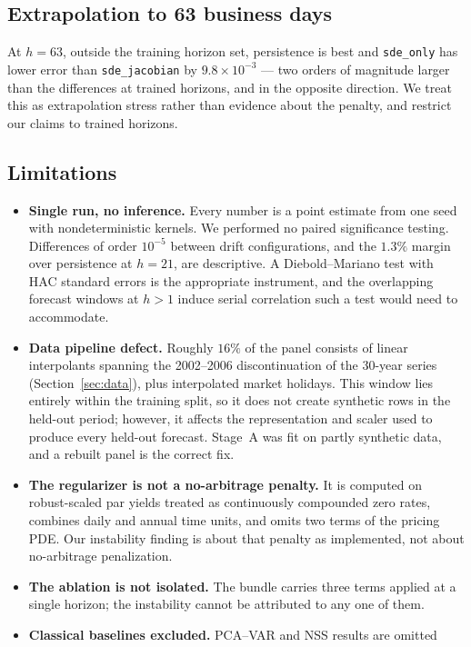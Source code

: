 \documentclass{article} %
\begin{document}
\subsection{Extrapolation to 63 business days}
\label{sec:analysis-h63}
At $h{=}63$, outside the training horizon set, persistence is best and
\texttt{sde\_only} has lower error than \texttt{sde\_jacobian} by $9.8\times10^{-3}$
--- two orders of magnitude larger than the differences at trained horizons, and in
the opposite direction. We treat this as extrapolation stress rather than evidence
about the penalty, and restrict our claims to trained horizons.
\subsection{Limitations}
\label{sec:analysis-limitations}
\begin{itemize}
  \item \textbf{Single run, no inference.} Every number is a point estimate from one
  seed with nondeterministic kernels. We performed no paired significance testing.
  Differences of order $10^{-5}$ between drift configurations, and the $1.3\%$ margin
  over persistence at $h{=}21$, are descriptive. A Diebold--Mariano test with HAC
  standard errors is the appropriate instrument, and the overlapping forecast windows
  at $h>1$ induce serial correlation such a test would need to accommodate.
  \item \textbf{Data pipeline defect.} Roughly $16\%$ of the panel consists of linear
  interpolants spanning the 2002--2006 discontinuation of the 30-year series
  (Section~\ref{sec:data}), plus interpolated market holidays. This window lies
  entirely within the training split, so it does not create synthetic rows in the
  held-out period; however, it affects the representation and scaler used to produce
  every held-out forecast. Stage~A was fit on partly synthetic data, and a rebuilt
  panel is the correct fix.
  \item \textbf{The regularizer is not a no-arbitrage penalty.} It is computed on
  robust-scaled par yields treated as continuously compounded zero rates, combines
  daily and annual time units, and omits two terms of the pricing PDE. Our
  instability finding is about that penalty as implemented, not about no-arbitrage
  penalization.
  \item \textbf{The ablation is not isolated.} The bundle carries three terms applied
  at a single horizon; the instability cannot be attributed to any one of them.
  \item \textbf{Classical baselines excluded.} PCA--VAR and NSS results are omitted

\end{itemize}
\end{document}
